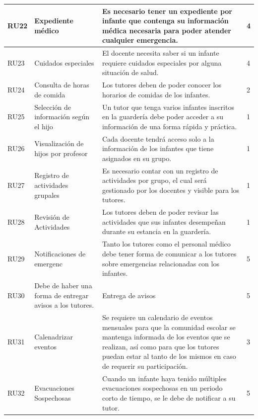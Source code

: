 \documentclass{article}
\begin{document}
\begin{longtable}{|p{1.0cm}|p{3.8cm}|p{5.0cm}|p{1.2cm}|}
	RU22 &
	Expediente médico &
	Es necesario tener un expediente por infante que contenga su información médica necesaria para poder atender cualquier emergencia. &
	4
	\\ \hline

	RU23 &
	Cuidados especiales &
	El docente necesita saber si un infante requiere cuidados especiales por alguna situación de salud. &
	4
	\\ \hline

	RU24 &
	Consulta de horas de comida &
	Los tutores deben de poder conocer los horarios de comidas de los infantes. &
	2
	\\ \hline

	RU25 &
	Selección de información según el hijo &
	Un tutor que tenga varios infantes inscritos en la guardería debe poder acceder a su información de una forma rápida y práctica. &
	1
	\\ \hline

	RU26 &
	Visualización de hijos por profesor &
	Cada docente tendrá acceso solo a la información de los infantes que tiene asignados en su grupo. &
	1
	\\ \hline

	RU27 &
	Registro de actividades grupales &
	Es necesario contar con un registro de actividades por grupo, el cual será gestionado por los docentes y visible para los tutores. &
	1
	\\ \hline

	RU28 &
	Revisión de Actividades &
	Los tutores deben de poder revisar las actividades que sus infantes desempeñan durante su estancia en la guardería. &
	1
	\\ \hline

	RU29 &
	Notificaciones de emergenc &
	Tanto los tutores como el personal médico debe tener forma de comunicar a los tutores sobre emergencias relacionadas con los infantes. &
	5
	\\ \hline

	RU30 &
	Debe de haber una forma de entregar avisos a los tutores. &
	Entrega de avisos &
	5
	\\ \hline

	RU31 &
	Calenadrizar eventos&
	Se requiere un calendario de eventos mensuales para que la comunidad escolar se mantenga informada de los eventos que se realizan, así como para que los tutores puedan estar al tanto de los mismos en caso de requerir su participación. &
	3
	\\ \hline
	
	RU32 &
	Evacuaciones Sospechosas &
	Cuando un infante haya tenido múltiples evacuaciones sospechosas en un periodo corto de tiempo, se le debe de notificar a su tutor.&
	5
	\\ \hline


\end{longtable}
\end{document}
